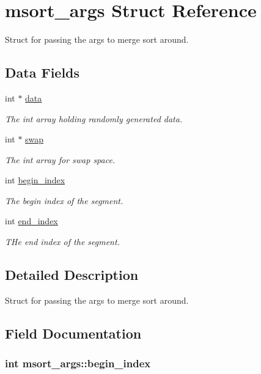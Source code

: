 \hypertarget{structmsort__args}{\section{msort\+\_\+args Struct Reference}
\label{structmsort__args}
}


Struct for passing the args to merge sort around.  


\subsection*{Data Fields}
\begin{DoxyCompactItemize}
\item 
int $\ast$ \hyperlink{structmsort__args_a20fc91c94125858e1d7c0178fa95b225}{data}
\begin{DoxyCompactList}\small\item\em The int array holding randomly generated data. \end{DoxyCompactList}\item 
int $\ast$ \hyperlink{structmsort__args_aff28cf75b66fcdfd905e3de0c63c6044}{swap}
\begin{DoxyCompactList}\small\item\em The int array for swap space. \end{DoxyCompactList}\item 
int \hyperlink{structmsort__args_a602f1687d2c191b78b2a9368b478dd6e}{begin\+\_\+index}
\begin{DoxyCompactList}\small\item\em The begin index of the segment. \end{DoxyCompactList}\item 
int \hyperlink{structmsort__args_a509e9dbf758788d6eb0604ab5ed6f6e3}{end\+\_\+index}
\begin{DoxyCompactList}\small\item\em T\+He end index of the segment. \end{DoxyCompactList}\end{DoxyCompactItemize}


\subsection{Detailed Description}
Struct for passing the args to merge sort around. 

\subsection{Field Documentation}
\hypertarget{structmsort__args_a602f1687d2c191b78b2a9368b478dd6e}{
\subsubsection[{begin\+\_\+index}]{\setlength{\rightskip}{0pt plus 5cm}int msort\+\_\+args\+::begin\+\_\+index}}\label{structmsort__args_a602f1687d2c191b78b2a9368b478dd6e}


